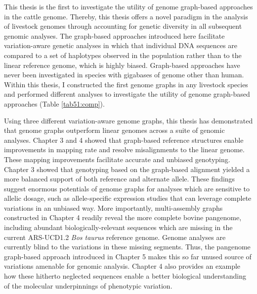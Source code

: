 \documentclass[../main.tex]{subfiles}
\begin{document}
\fi


\graphicspath{{figure/}{../figure/}}

\newpage
\onehalfspacing

\linespread{1.25}
\setlength{\parskip}{\baselineskip}

\normalsize


This thesis is the first to investigate the utility of genome graph-based approaches in the cattle genome. Thereby, this thesis offers a novel paradigm in the analysis of livestock genomes through accounting for genetic diversity in all subsequent genomic analyses. The graph-based approaches introduced here facilitate variation-aware genetic analyses in which that individual DNA sequences are compared to a set of haplotypes observed in the population rather than to the linear reference genome, which is highly biased. Graph-based approaches have never been investigated in species with gigabases of genome other than human. Within this thesis, I constructed the first genome graphs in any livestock species and performed different analyses to investigate the utility of genome graph-based approaches (Table \ref{tab51:comp}).  

Using three different variation-aware genome graphs, this thesis has demonstrated  that genome graphs outperform linear genomes across a suite of genomic analyses. Chapter 3 and 4 showed that graph-based reference structures enable improvements in mapping rate and resolve misalignments to the linear genome. These mapping improvements facilitate accurate and unbiased genotyping. Chapter 3 showed that genotyping based on the graph-based alignment yielded a more balanced support of both reference and alternate allele. These findings suggest enormous potentials of genome graphs for analyses which are sensitive to allelic dosage, such as allele-specific expression studies that can leverage complete variations in an unbiased way. More importantly, multi-assembly graphs constructed in Chapter 4 readily reveal the more complete bovine pangenome, including abundant biologically-relevant sequences which are missing in the current ARS-UCD1.2 \emph{Bos taurus} reference genome. Genome analyses are currently blind to the variations in these missing segments. Thus, the pangenome graph-based approach introduced in Chapter 5 makes this so far unused source of variations amenable for genomic analysis. Chapter 4 also provides an example how these hitherto neglected sequences enable a better biological understanding of the molecular underpinnings of phenotypic variation. 
\end{document}
